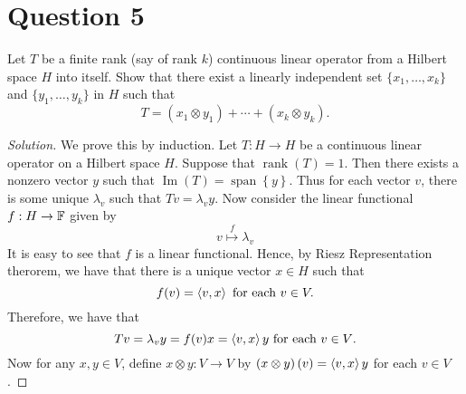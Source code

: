 \section{Question 5}
\horz
Let $T$ be a finite  rank  (say of rank $k$)  continuous linear operator from a Hilbert space $H$ into itself. Show that there exist a linearly independent set $\{x_1,\ldots,x_k\}$ and $\{y_1,\ldots,y_k\}$ in $H$ such that $$T= (x_1\otimes y_1) + \cdots + (x_k\otimes y_k).$$  
\horz
\begin{proof}[Solution]
    We prove this by induction. Let $T : H \to H$ be a continuous linear operator on a Hilbert space $H$. Suppose that $\operatorname{rank} \left( T \right) = 1$. Then there exists a nonzero vector $y$ such that $\operatorname{Im} \left( T \right) = \operatorname{span} \left\{ y \right\}$. Thus for each vector $v$, there is some unique $\lambda _{v}$ such that $Tv= \lambda_{v} y$. Now consider the linear functional $f: H \to \mathbb F$ given by
    \begin{equation*}
	v \stackrel{f}{\mapsto} \lambda_{v}
    \end{equation*}
    It is easy to see that $f$ is a linear functional. Hence, by Riesz Representation therorem, we have that there is a unique vector $x \in H$ such that 
    \begin{equation*}
	f(v)=\left\langle v,x \right\rangle \text{ for each } v \in V.
    \end{equation*}
    Therefore, we have that 
    \begin{equation*}
	Tv= \lambda_{v} y = f(v)x = \left\langle v,x \right\rangle y \text{ for each } v\in V\text{.}
    \end{equation*}
    Now for any $x,y\in V$, define $x\otimes y : V \to V$ by $\left( x\otimes y \right) \left( v \right) = \left\langle v,x \right\rangle y$ for each $v\in V$.
\end{proof}
